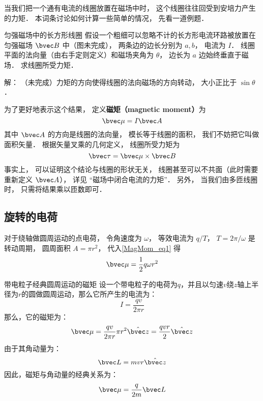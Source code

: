 
\begin{issues}
\issueTODO
\end{issues}


当我们把一个通有电流的线圈放置在磁场中时， 这个线圈往往回受到安培力产生的力矩． 本词条讨论如何计算一些简单的情况， 先看一道例题．

\begin{example}{匀强磁场中的长方形线圈}
假设一个粗细可以忽略不计的长方形电流环路被放置在匀强磁场 $\bvec B$ 中（图未完成）， 两条边的边长分别为 $a, b$， 电流为 $I$． 线圈平面的法向量（由右手定则定义）和磁场夹角为 $\theta$， 边长为 $a$ 边始终垂直于磁场． 求线圈所受力矩．

解： （未完成）力矩的方向使得线圈的法向磁场的方向转动， 大小正比于 $\sin\theta$．
\end{example}

为了更好地表示这个结果， 定义\textbf{磁矩（magnetic moment）}为
\begin{equation}\label{MagMom_eq1}
\bvec \mu = I \bvec A
\end{equation}
其中 $\bvec A$ 的方向是线圈的法向量， 模长等于线圈的面积， 我们不妨把它叫做面积矢量． 根据矢量叉乘的几何定义， 线圈所受力矩为
\begin{equation}
\bvec \tau = \bvec \mu \times \bvec B
\end{equation}
事实上， 可以证明这个结论与线圈的形状无关， 线圈甚至可以不共面（此时需要重新定义 $\bvec A$）， 详见 “磁场中闭合电流的力矩”． 另外， 当我们由多匝线圈时， 只需将结果乘以匝数即可．

\subsection{旋转的电荷}
对于绕轴做圆周运动的点电荷， 令角速度为 $\omega$， 等效电流为 $q/T$， $T = 2\pi/\omega$ 是转动周期， 圆周面积 $A = \pi r^2$， 代入\autoref{MagMom_eq1} 得
\begin{equation}
\bvec \mu = \frac{1}{2} q\omega r^2
\end{equation}

\begin{example}{带电粒子经典圆周运动的磁矩}\label{MagMom_ex1}
设一个带电粒子的电荷为$q$，并且以匀速$v$绕$z$轴上半径为$r$的圆做圆周运动，那么它所产生的电流为：
\begin{equation}
I=\frac{qv}{2\pi r}
\end{equation}
那么，它的磁矩为：
\begin{equation}
\bvec\mu  = \frac{qv}{2\pi r}\pi r^2 \hat{\bvec z}=\frac{qvr}{2} \hat{\bvec z} 
\end{equation}
由于其角动量为：
\begin{equation}
\bvec L =mvr\hat{\bvec z}
\end{equation}
因此，磁矩与角动量的经典关系为：
\begin{equation}
\bvec\mu  = \frac{q}{2m}\bvec L
\end{equation}

\end{example}
